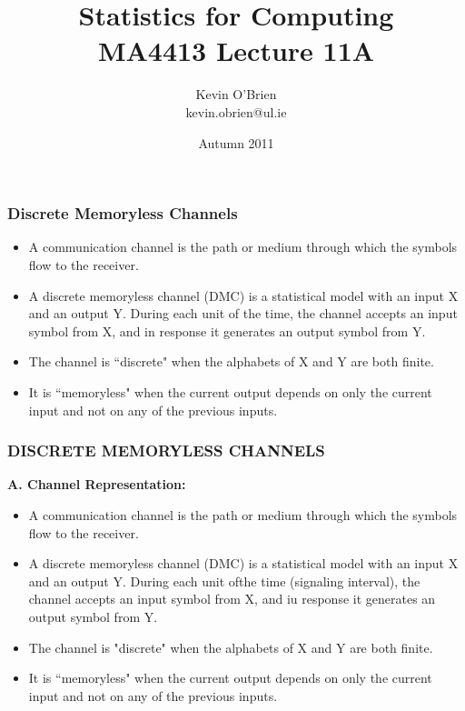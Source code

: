 \documentclass[a4]{beamer}
\title[MA4413]{Statistics for Computing \\ {\normalsize MA4413 Lecture 11A}}
\author[Kevin O'Brien]{Kevin O'Brien \\ {\scriptsize kevin.obrien@ul.ie}}
\date{Autumn 2011}
\begin{document}
\begin{frame} \frametitle{Discrete Memoryless Channels}
\begin{itemize}
	\item A communication channel is the path or medium through which the symbols flow to the receiver. \item A discrete memoryless channel (DMC) is a statistical model with an input X and an output Y.
	During each unit of the time, the channel accepts an input symbol from X, and in
	response it generates an output symbol from Y. \item  The channel is ``discrete" when the alphabets of X and
	Y are both finite.\item It is ``memoryless" when the current output depends on only the current input and
	not on any of the previous inputs.\end{itemize}
\end{frame}




\begin{frame} \frametitle{DISCRETE MEMORYLESS CHANNELS}
\textbf{A. Channel Representation:}\\
\begin{itemize}
	\item A communication channel is the path or medium through which the symbols flow to the receiver. \item A discrete memoryless channel (DMC) is a statistical model with an input X and an output Y.
	During each unit ofthe time (signaling interval), the channel accepts an input symbol from X, and iu
	response it generates an output symbol from Y.\item  The channel is "discrete" when the alphabets of X and
	Y are both finite.\item It is ``memoryless" when the current output depends on only the current input and
	not on any of the previous inputs.\end{itemize}
\end{frame}
\end{document}
